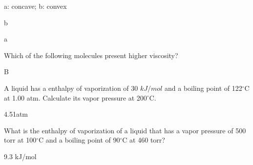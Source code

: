 \documentclass[main.tex]{subfiles}
\begin{document}
\begin{multicols*}{2}
\begin{question}[ID=\the\value{numA}]
\begin{center}
{\begin{tikzpicture}
\end{tikzpicture}}\end{center}

\end{question}
\begin{solution}
\begin{inparaenum}[(a)]
\item  a: concave; b: convex
\item  b
\item  a
\end{inparaenum} \hspace{0.1cm}\end{solution}
\begin{question}[ID=\the\value{numA}]
Which of the following molecules present higher viscosity?
 \begin{center}\hspace{0.5cm}
  \end{center}
\end{question}
\begin{solution}
B
 \hspace{0.1cm}\end{solution}

\begin{question}[ID=\the\value{numA}]
A liquid has a  enthalpy of vaporization of 30 $kJ/mol$ and a boiling point of 122$^{\circ}$C at 1.00 atm. Calculate its vapor pressure at 200$^{\circ}$C.
\end{question}
\begin{solution}
4.51atm
 \hspace{0.1cm}\end{solution}







\begin{question}[ID=\the\value{numA}]
What is the  enthalpy of vaporization of a liquid that has a vapor pressure of 500 torr at 100$^{\circ}$C and a boiling point of 90$^{\circ}$C at 460 torr?
\end{question}
\begin{solution}
9.3 kJ/mol
 \hspace{0.1cm}\end{solution}



\end{multicols*}
\end{document}
